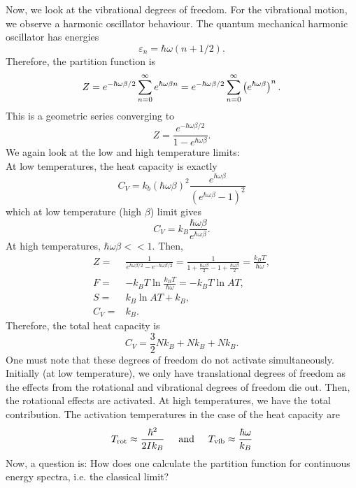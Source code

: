     Now, we look at the vibrational degrees of freedom. For the vibrational motion, we observe a harmonic oscillator behaviour. The quantum mechanical harmonic oscillator has energies
    \begin{equation}
        \varepsilon_n = \hbar\omega(n+1/2).
    \end{equation}
    Therefore, the partition function is
    \begin{equation}
        Z = e^{-\hbar\omega\beta/2}\sum_{n=0}^\infty e^{\hbar\omega\beta n} = e^{-\hbar\omega\beta/2}\sum_{n=0}^\infty \left( e^{\hbar\omega\beta} \right)^n.
    \end{equation}
    This is a geometric series converging to
    \begin{equation}
        Z = \frac{e^{-\hbar\omega\beta/2}}{1-e^{\hbar\omega\beta}}.
    \end{equation}
    We again look at the low and high temperature limits:\\
    At low temperatures, the heat capacity is exactly
    \begin{equation}
        C_V=k_b(\hbar\omega\beta)^2\frac{e^{\hbar\omega\beta}}{(e^{\hbar\omega\beta}-1)^2}
    \end{equation}
    which at low temperature (high $\beta$) limit gives
    \begin{equation}
        C_V=k_B\frac{\hbar\omega\beta}{e^{\hbar\omega\beta}}.
    \end{equation}
    At high temperatures, $\hbar\omega\beta<<1$. Then,
    \begin{align}
        Z =& \frac{1}{e^{\hbar\omega\beta/2}-e^{-\hbar\omega\beta/2}}=\frac{1}{1+\frac{\hbar\omega\beta}{2}-1+\frac{\hbar\omega\beta}{2}} = \frac{k_BT}{\hbar\omega}, \\
        F =& -k_BT\ln\frac{k_BT}{\hbar\omega} = -k_BT\ln AT, \\
        S =& k_B\ln AT + k_B, \\
        C_V =& k_B.
    \end{align}
    Therefore, the total heat capacity is
    \begin{equation}
        C_V=\frac{3}{2}Nk_B + Nk_B + Nk_B.
    \end{equation}
    One must note that these degrees of freedom do not activate simultaneously. Initially (at low temperature), we only have translational degrees of freedom as the effects from the rotational and vibrational degrees of freedom die out. Then, the rotational effects are activated. At high temperatures, we have the total contribution. The activation temperatures in the case of the heat capacity are
    \begin{equation}
        T_{\mathrm{rot}} \approx \frac{\hbar^2}{2Ik_B} \hspace{0.5cm}\mathrm{and}\hspace{0.5cm}T_\mathrm{vib}\approx\frac{\hbar\omega}{k_B}
    \end{equation}
    Now, a question is: How does one calculate the partition function for continuous energy spectra, i.e. the classical limit?
